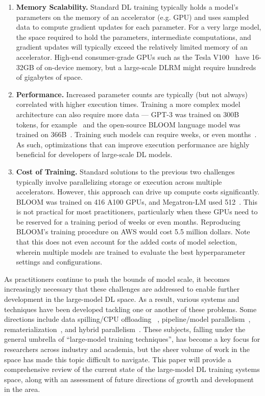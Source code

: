 \begin{enumerate}
\item \textbf{Memory Scalability.} Standard DL training typically holds a model's parameters on the memory of an accelerator (e.g. GPU) and uses sampled data to compute gradient updates for each parameter. For a very large model, the space required to hold the parameters, intermediate computations, and gradient updates will typically exceed the relatively limited memory of an accelerator. High-end consumer-grade GPUs such as the Tesla V100~\cite{teslav100} have 16-32GB of on-device memory, but a large-scale DLRM might require hundreds of gigabytes of space.
\item \textbf{Performance.} Increased parameter counts are typically (but not always) correlated with higher execution times. Training a more complex model architecture can also require more data --- GPT-3 was trained on 300B tokens, for example~\cite{gpt2020} and the open-source BLOOM language model was trained on 366B~\cite{bloom2022}. Training such models can require weeks, or even months~\cite{dlrm2019,bloom2022}. As such, optimizations that can improve execution performance are highly beneficial
for developers of large-scale DL models.
\item \textbf{Cost of Training.} Standard solutions to the previous two challenges typically involve parallelizing storage or execution across multiple accelerators. However, this approach can drive up compute costs significantly. BLOOM was trained on 416 A100 GPUs, and Megatron-LM used 512~\cite{megatronlmblog2020}. This is not practical for most practitioners, particularly when these GPUs need to be reserved for a training period of weeks or even months. Reproducing BLOOM's training procedure on AWS
would cost 5.5 million dollars. Note that this does not even account for the added costs of model selection, wherein multiple models are trained to evaluate the best hyperparameter settings and configurations.
\end{enumerate}

As practitioners continue to push the bounds of model scale, it becomes increasingly necessary that these challenges are addressed to enable further development in the large-model DL space. As a result, various systems and techniques have been developed tackling one or another of these problems. Some directions include data spilling/CPU offloading
~\cite{zero2019, zero2021,hydra2021,mpms2021,swapadvisor2021,l2l2020}, pipeline/model parallelism~\cite{gpipe2018,pipedream2018,terapipe2021,torchgpipe2020,megatronlmgpuscaling2021}, rematerialization~\cite{checkpointing2016}, and hybrid parallelism~\cite{flexflow2018,alpa2022,hydra2021,mpms2021,gshard2020}. These subjects, falling under the general umbrella of ``large-model training techniques'', has become a key focus for researchers across industry and academia, but the sheer volume of work in the space has made this topic difficult to navigate. This paper will provide a comprehensive review of the current state of the large-model DL training systems space, along with an assessment of future directions of growth and development in the area.

